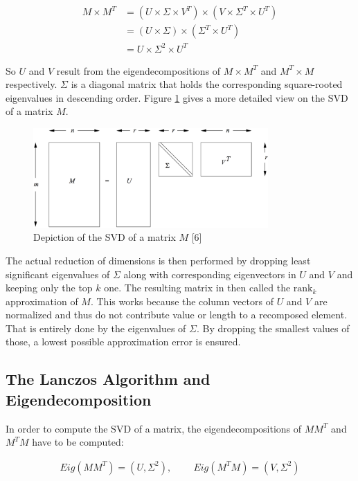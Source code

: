 \begin{align*}
M \times M^T 	& = (U \times \Sigma \times V^T) \times (V \times \Sigma^T \times
U^T) \\
					& = (U \times \Sigma) \times (\Sigma^T \times U^T) \\
					& = U \times \Sigma^2 \times U^T
\end{align*}

So $U$ and $V$ result from the eigendecompositions of $M\times M^T$ and $M^T\times M$ respectively. $\Sigma$ is a diagonal matrix that holds the corresponding square-rooted eigenvalues in descending order. Figure \ref{fig:svd} gives a more detailed view on the SVD of a matrix $M$. 

\begin{figure}[h]
	\centering
	\includegraphics[width=0.8\textwidth]{images/svd_mmds.png}
	\caption{Depiction of the SVD of a matrix $M$ [6]}
	\label{fig:svd}
\end{figure}

The actual reduction of dimensions is then performed by dropping least significant eigenvalues of $\Sigma$ along with corresponding eigenvectors in $U$ and $V$ and keeping only the top $k$ one. The resulting matrix in then called the $\text{rank}_k$ approximation of $M$. This works because the column vectors of $U$ and $V$ are normalized and thus do not contribute value or length to a recomposed element. That is entirely done by the eigenvalues of $\Sigma$. By dropping the smallest values of those, a lowest possible approximation error is ensured.

\subsection{The Lanczos Algorithm and Eigendecomposition}
\label{ssec:lanczos_algorithm}

In order to compute the SVD of a matrix, the eigendecompositions of $MM^T$ and $M^T M$ have to be computed:

\begin{align*}
	Eig(MM^T) = (U,\Sigma^2), \;	\;\;	\;\;	\;\;\;	Eig(M^T M) = (V,\Sigma^2)
\end{align*}

